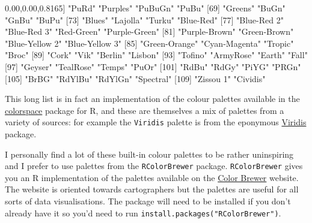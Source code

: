 \documentclass[
]{book}
\newenvironment{Shaded}{\begin{snugshade}}{\end{snugshade}}
\newcommand{\DecValTok}[1]{\textcolor[rgb]{0.00,0.00,0.81}{#1}}
\newcommand{\NormalTok}[1]{#1}
\newcommand{\StringTok}[1]{\textcolor[rgb]{0.31,0.60,0.02}{#1}}
\begin{document}
\begin{Shaded}
\begin{Highlighting}[]
\NormalTok{ [}\DecValTok{65}\NormalTok{] }\StringTok{"PuRd"}          \StringTok{"Purples"}       \StringTok{"PuBuGn"}        \StringTok{"PuBu"}         
\NormalTok{ [}\DecValTok{69}\NormalTok{] }\StringTok{"Greens"}        \StringTok{"BuGn"}          \StringTok{"GnBu"}          \StringTok{"BuPu"}         
\NormalTok{ [}\DecValTok{73}\NormalTok{] }\StringTok{"Blues"}         \StringTok{"Lajolla"}       \StringTok{"Turku"}         \StringTok{"Blue-Red"}     
\NormalTok{ [}\DecValTok{77}\NormalTok{] }\StringTok{"Blue-Red 2"}    \StringTok{"Blue-Red 3"}    \StringTok{"Red-Green"}     \StringTok{"Purple-Green"} 
\NormalTok{ [}\DecValTok{81}\NormalTok{] }\StringTok{"Purple-Brown"}  \StringTok{"Green-Brown"}   \StringTok{"Blue-Yellow 2"} \StringTok{"Blue-Yellow 3"}
\NormalTok{ [}\DecValTok{85}\NormalTok{] }\StringTok{"Green-Orange"}  \StringTok{"Cyan-Magenta"}  \StringTok{"Tropic"}        \StringTok{"Broc"}         
\NormalTok{ [}\DecValTok{89}\NormalTok{] }\StringTok{"Cork"}          \StringTok{"Vik"}           \StringTok{"Berlin"}        \StringTok{"Lisbon"}       
\NormalTok{ [}\DecValTok{93}\NormalTok{] }\StringTok{"Tofino"}        \StringTok{"ArmyRose"}      \StringTok{"Earth"}         \StringTok{"Fall"}         
\NormalTok{ [}\DecValTok{97}\NormalTok{] }\StringTok{"Geyser"}        \StringTok{"TealRose"}      \StringTok{"Temps"}         \StringTok{"PuOr"}         
\NormalTok{[}\DecValTok{101}\NormalTok{] }\StringTok{"RdBu"}          \StringTok{"RdGy"}          \StringTok{"PiYG"}          \StringTok{"PRGn"}         
\NormalTok{[}\DecValTok{105}\NormalTok{] }\StringTok{"BrBG"}          \StringTok{"RdYlBu"}        \StringTok{"RdYlGn"}        \StringTok{"Spectral"}     
\NormalTok{[}\DecValTok{109}\NormalTok{] }\StringTok{"Zissou 1"}      \StringTok{"Cividis"}      
\end{Highlighting}
\end{Shaded}

This long list is in fact an implementation of the colour palettes available in the \href{https://cran.r-project.org/web/packages/colorspace/vignettes/colorspace.html}{colorspace} package for R, and these are themselves a mix of palettes from a variety of sources: for example the \texttt{Viridis} palette is from the eponymous \href{https://cran.r-project.org/web/packages/viridis/vignettes/intro-to-viridis.html}{Viridis} package.

I personally find a lot of these built-in colour palettes to be rather uninspiring and I prefer to use palettes from the \texttt{RColorBrewer} package. \texttt{RColorBrewer} gives you an R implementation of the palettes available on the \href{http://colorbrewer2.org/}{Color Brewer} website. The website is oriented towards cartographers but the palettes are useful for all sorts of data visualisations. The package will need to be installed if you don't already have it so you'd need to run \texttt{install.packages("RColorBrewer")}.
\end{document}

